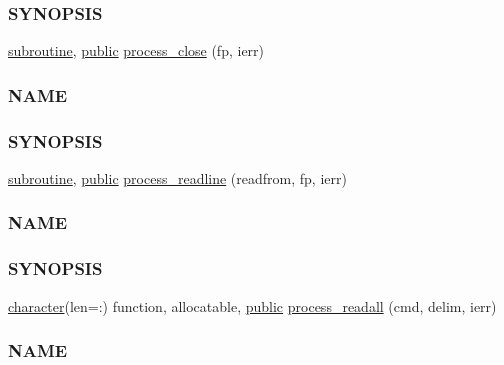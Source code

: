 \begin{DoxyCompactItemize}
\begin{DoxyCompactList}
\subsubsection*{S\+Y\+N\+O\+P\+S\+IS}\end{DoxyCompactList}\item 
\hyperlink{M__stopwatch_83_8txt_acfbcff50169d691ff02d4a123ed70482}{subroutine}, \hyperlink{M__stopwatch_83_8txt_a2f74811300c361e53b430611a7d1769f}{public} \hyperlink{namespacem__process_ab4c5cad3fb46686f0c9b71c3a634f6ae}{process\+\_\+close} (fp, ierr)
\begin{DoxyCompactList}\small\item\em \subsubsection*{N\+A\+ME}

\subsubsection*{S\+Y\+N\+O\+P\+S\+IS}\end{DoxyCompactList}\item 
\hyperlink{M__stopwatch_83_8txt_acfbcff50169d691ff02d4a123ed70482}{subroutine}, \hyperlink{M__stopwatch_83_8txt_a2f74811300c361e53b430611a7d1769f}{public} \hyperlink{namespacem__process_acbc72c5ed371430a471aa1f3010fbbda}{process\+\_\+readline} (readfrom, fp, ierr)
\begin{DoxyCompactList}\small\item\em \subsubsection*{N\+A\+ME}

\subsubsection*{S\+Y\+N\+O\+P\+S\+IS}\end{DoxyCompactList}\item 
\hyperlink{option__stopwatch_83_8txt_abd4b21fbbd175834027b5224bfe97e66}{character}(len=\+:) function, allocatable, \hyperlink{M__stopwatch_83_8txt_a2f74811300c361e53b430611a7d1769f}{public} \hyperlink{namespacem__process_a7dd759a1344789477ae1e205d7fa9a51}{process\+\_\+readall} (cmd, delim, ierr)
\begin{DoxyCompactList}\small\item\em \subsubsection*{N\+A\+ME}


\end{DoxyCompactList}
\end{DoxyCompactItemize}
